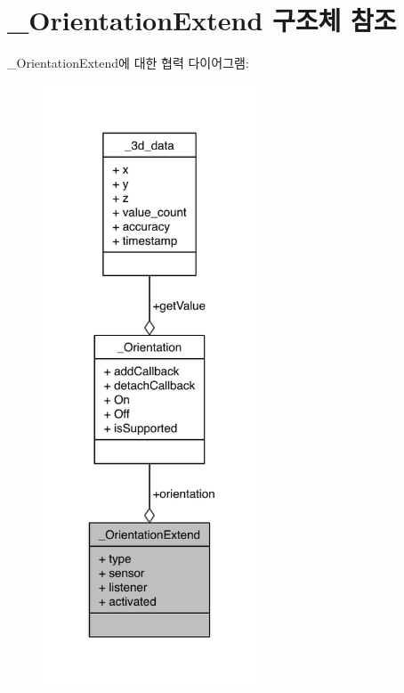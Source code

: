 \hypertarget{struct__OrientationExtend}{\section{\-\_\-\-Orientation\-Extend 구조체 참조}
\label{struct__OrientationExtend}
}


\-\_\-\-Orientation\-Extend에 대한 협력 다이어그램\-:\nopagebreak
\begin{figure}[H]
\begin{center}
\leavevmode
\includegraphics[width=185pt]{da/dd4/struct__OrientationExtend__coll__graph}
\end{center}
\end{figure}
